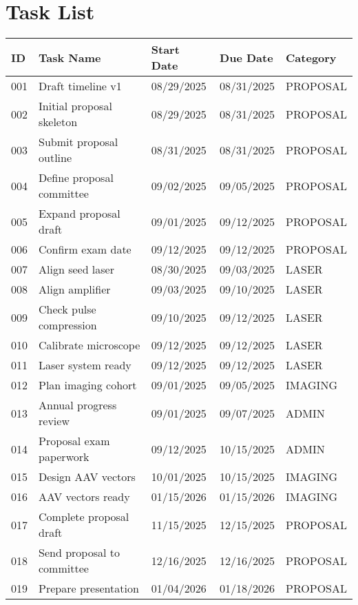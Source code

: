 \documentclass[portrait,a4paper]{article}
\begin{document}
\section*{Task List}
\begin{longtable}{|p{}|p{}|p{}|p{}|p{}|}
\hline
\textbf{ID} & \textbf{Task Name} & \textbf{Start Date} & \textbf{Due Date} & \textbf{Category} \\
\hline
\endhead
001 & Draft timeline v1 & 08/29/2025 & 08/31/2025 & PROPOSAL \\
\hline
002 & Initial proposal skeleton & 08/29/2025 & 08/31/2025 & PROPOSAL \\
\hline
003 & Submit proposal outline & 08/31/2025 & 08/31/2025 & PROPOSAL \\
\hline
004 & Define proposal committee & 09/02/2025 & 09/05/2025 & PROPOSAL \\
\hline
005 & Expand proposal draft & 09/01/2025 & 09/12/2025 & PROPOSAL \\
\hline
006 & Confirm exam date & 09/12/2025 & 09/12/2025 & PROPOSAL \\
\hline
007 & Align seed laser & 08/30/2025 & 09/03/2025 & LASER \\
\hline
008 & Align amplifier & 09/03/2025 & 09/10/2025 & LASER \\
\hline
009 & Check pulse compression & 09/10/2025 & 09/12/2025 & LASER \\
\hline
010 & Calibrate microscope & 09/12/2025 & 09/12/2025 & LASER \\
\hline
011 & Laser system ready & 09/12/2025 & 09/12/2025 & LASER \\
\hline
012 & Plan imaging cohort & 09/01/2025 & 09/05/2025 & IMAGING \\
\hline
013 & Annual progress review & 09/01/2025 & 09/07/2025 & ADMIN \\
\hline
014 & Proposal exam paperwork & 09/12/2025 & 10/15/2025 & ADMIN \\
\hline
015 & Design AAV vectors & 10/01/2025 & 10/15/2025 & IMAGING \\
\hline
016 & AAV vectors ready & 01/15/2026 & 01/15/2026 & IMAGING \\
\hline
017 & Complete proposal draft & 11/15/2025 & 12/15/2025 & PROPOSAL \\
\hline
018 & Send proposal to committee & 12/16/2025 & 12/16/2025 & PROPOSAL \\
\hline
019 & Prepare presentation & 01/04/2026 & 01/18/2026 & PROPOSAL \\

\end{longtable}
\end{document}
